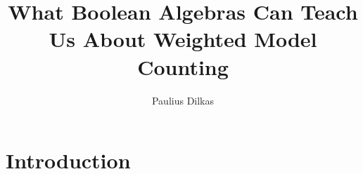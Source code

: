 \documentclass{article}
\title{What Boolean Algebras Can Teach Us About Weighted Model Counting}
\author{Paulius Dilkas}
\theoremstyle{definition}
\theoremstyle{remark}
\begin{document}
\maketitle

\section{Introduction}





\end{document}
